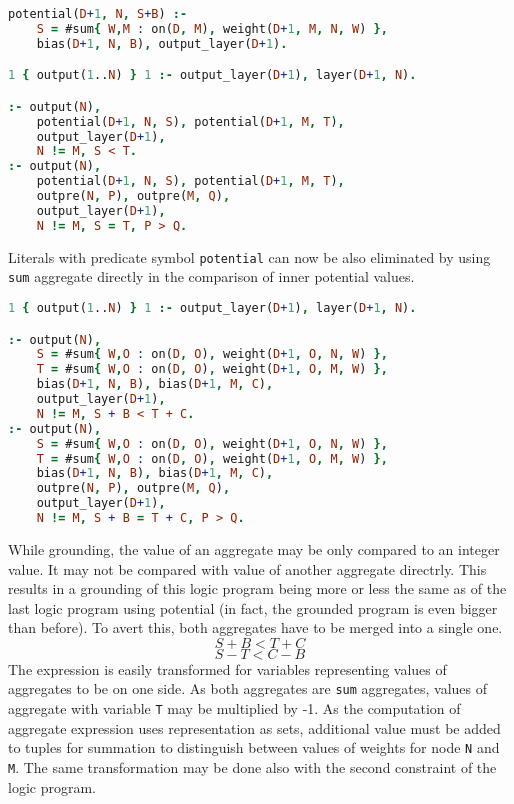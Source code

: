 \begin{lstlisting}[language=Prolog, numbers=none]
potential(D+1, N, S+B) :-
    S = #sum{ W,M : on(D, M), weight(D+1, M, N, W) },
    bias(D+1, N, B), output_layer(D+1).

1 { output(1..N) } 1 :- output_layer(D+1), layer(D+1, N).

:- output(N),
    potential(D+1, N, S), potential(D+1, M, T),
    output_layer(D+1),
    N != M, S < T.
:- output(N),
    potential(D+1, N, S), potential(D+1, M, T),
    outpre(N, P), outpre(M, Q),
    output_layer(D+1),
    N != M, S = T, P > Q.
\end{lstlisting}

Literals with predicate symbol \texttt{potential} can now be also eliminated
by using \texttt{sum} aggregate directly in the comparison of inner potential values.

\begin{lstlisting}[language=Prolog, numbers=none]
1 { output(1..N) } 1 :- output_layer(D+1), layer(D+1, N).

:- output(N),
    S = #sum{ W,O : on(D, O), weight(D+1, O, N, W) },
    T = #sum{ W,O : on(D, O), weight(D+1, O, M, W) },
    bias(D+1, N, B), bias(D+1, M, C),
    output_layer(D+1),
    N != M, S + B < T + C.
:- output(N),
    S = #sum{ W,O : on(D, O), weight(D+1, O, N, W) },
    T = #sum{ W,O : on(D, O), weight(D+1, O, M, W) },
    bias(D+1, N, B), bias(D+1, M, C),
    outpre(N, P), outpre(M, Q),
    output_layer(D+1),
    N != M, S + B = T + C, P > Q.
\end{lstlisting}

While grounding, the value of an aggregate may be only compared to an integer value.
It may not be compared with value of another aggregate directrly. This results in
a grounding of this logic program being more or less the same as of the last logic program
using potential (in fact, the grounded program is even bigger than before).
To avert this, both aggregates have to be merged into a single one.
\[S + B < T + C\]
\[S - T < C - B\]
The expression is easily transformed for variables representing values of aggregates to be
on one side. As both aggregates are \texttt{sum} aggregates, values of aggregate with variable
\texttt{T} may be multiplied by -1. As the computation of aggregate expression uses
representation as sets, additional value must be added to tuples for summation to distinguish
between values of weights for node \texttt{N} and \texttt{M}.
The same transformation may be done also with the second constraint of the logic program.

